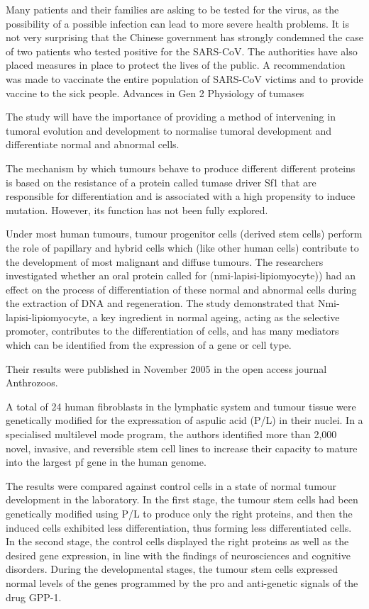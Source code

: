 \documentclass{article}
\begin{document}
Many patients and their families are asking to be tested for the virus, as the possibility of a possible infection can lead to more severe health problems. It is not very surprising that the Chinese government has strongly condemned the case of two patients who tested positive for the SARS-CoV. The authorities have also placed measures in place to protect the lives of the public. A recommendation was made to vaccinate the entire population of SARS-CoV victims and to provide vaccine to the sick people. Advances in Gen 2 Physiology of tumases

The study will have the importance of providing a method of intervening in tumoral evolution and development to normalise tumoral development and differentiate normal and abnormal cells.

The mechanism by which tumours behave to produce different different proteins is based on the resistance of a protein called tumase driver Sf1 that are responsible for differentiation and is associated with a high propensity to induce mutation. However, its function has not been fully explored.

Under most human tumours, tumour progenitor cells (derived stem cells) perform the role of papillary and hybrid cells which (like other human cells) contribute to the development of most malignant and diffuse tumours. The researchers investigated whether an oral protein called for (nmi-lapisi-lipiomyocyte)) had an effect on the process of differentiation of these normal and abnormal cells during the extraction of DNA and regeneration. The study demonstrated that Nmi-lapisi-lipiomyocyte, a key ingredient in normal ageing, acting as the selective promoter, contributes to the differentiation of cells, and has many mediators which can be identified from the expression of a gene or cell type.

Their results were published in November 2005 in the open access journal Anthrozoos.

A total of 24 human fibroblasts in the lymphatic system and tumour tissue were genetically modified for the expressation of aspulic acid (P/L) in their nuclei. In a specialised multilevel mode program, the authors identified more than 2,000 novel, invasive, and reversible stem cell lines to increase their capacity to mature into the largest pf gene in the human genome.

The results were compared against control cells in a state of normal tumour development in the laboratory. In the first stage, the tumour stem cells had been genetically modified using P/L to produce only the right proteins, and then the induced cells exhibited less differentiation, thus forming less differentiated cells. In the second stage, the control cells displayed the right proteins as well as the desired gene expression, in line with the findings of neurosciences and cognitive disorders. During the developmental stages, the tumour stem cells expressed normal levels of the genes programmed by the pro and anti-genetic signals of the drug GPP-1.
\end{document}
